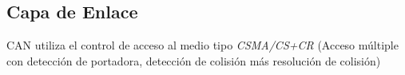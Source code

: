 \subsection{Capa de Enlace}
CAN utiliza el control de acceso al medio tipo \textit{CSMA/CS+CR} (Acceso múltiple con detección de portadora, detección de colisión más resolución de colisión)
